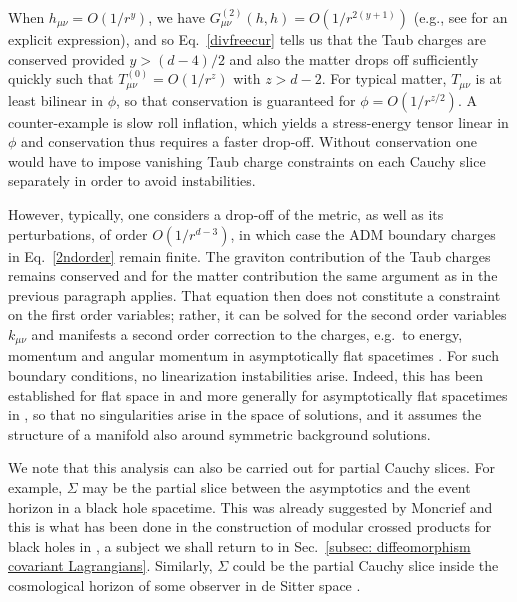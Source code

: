 \documentclass[]{jkpaper}
\theoremstyle{plain}
\theoremstyle{definition}
\begin{document}
When $h_{\mu \nu}=O(1/r^y)$, we have $G^{(2)}_{\mu \nu}(h,h)=O(1/r^{2(y+1)})$ (e.g., see \cite{Altas:2019qcv} for an explicit expression), and so Eq.~\eqref{divfreecur} tells us that the Taub charges are conserved provided $y>(d-4)/2$ and also the matter drops off sufficiently quickly such that $T^{(0)}_{\mu \nu}=O(1/r^z)$ with $z>d-2$. For typical matter, $T_{\mu \nu}$ is at least bilinear in $\phi$, so that conservation is guaranteed for $\phi=O(1/r^{z/2})$. A counter-example is slow roll inflation, which yields a stress-energy tensor linear in $\phi$ and conservation thus requires a faster drop-off. Without conservation one would have to impose vanishing Taub charge constraints on each Cauchy slice separately in order to avoid instabilities.

However, typically, one considers a drop-off of the metric, as well as its perturbations, of order $O(1/r^{d-3})$, in which case the ADM boundary charges in Eq.~\eqref{2ndorder} remain finite. The graviton contribution of the Taub charges remains conserved and for the matter contribution the same argument as in the previous paragraph applies.
That equation then does not constitute a constraint on the first order variables; rather, it can be solved for the second order variables $k_{\mu \nu}$ and manifests a second order correction to the charges, e.g.\ to energy, momentum and angular momentum in asymptotically flat spacetimes \cite[Sec.~6]{Moncrief:1976un}. For such boundary conditions, no linearization instabilities arise. Indeed, this has been established for flat space in \cite{Deser:1973zzb} and more generally for asymptotically flat spacetimes in \cite{choquet1979maximal}, so that no singularities arise in the space of solutions, and it assumes the structure of a manifold also around symmetric background solutions. 

We note that this analysis can also be carried out for partial Cauchy slices. For example, $\Sigma$ may be the partial slice between the asymptotics and the event horizon in a black hole spacetime. This was already suggested by Moncrief \cite[Sec.~6]{Moncrief:1976un} and this is what has been done in the construction of modular crossed products for black holes in \cite{Chandrasekaran:2022cip,Kudler-Flam:2023qfl,Faulkner:2024gst,Chen:2024rpx}, a subject we shall return to in Sec.~\ref{subsec: diffeomorphism covariant Lagrangians}. Similarly, $\Sigma$ could be the partial Cauchy slice inside the cosmological horizon of some observer in de Sitter space  \cite{Abbott:1981ff}.
\end{document}

